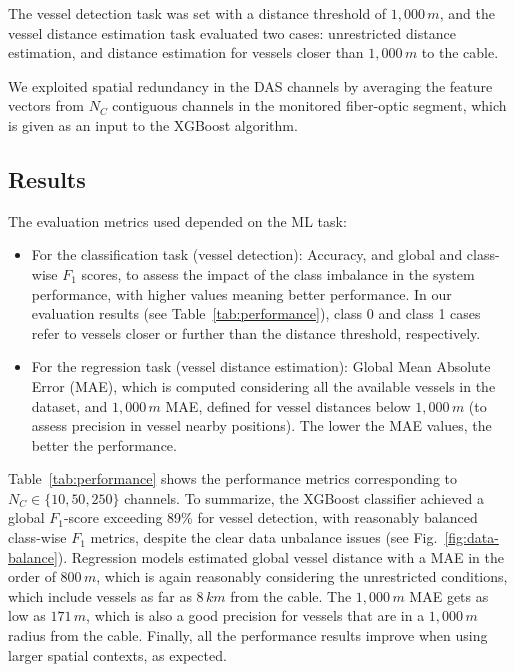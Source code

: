 \documentclass[11pt]{article}
\begin{document}
The vessel detection task was set with a distance threshold of $1{,}000\,m$, and the vessel distance estimation task evaluated two cases: unrestricted distance estimation, and distance estimation for vessels closer than $1{,}000\,m$ to the cable.

We exploited spatial redundancy in the DAS channels by averaging the feature vectors from $N_C$ contiguous channels in the monitored fiber-optic segment, which is given as an input to the XGBoost algorithm.


\subsection{Results}
\label{sec:results}

The evaluation metrics used depended on the ML task:

\begin{itemize}
  \item For the classification task (vessel detection): Accuracy, and global and class-wise $F_1$ scores, to assess the impact of the class imbalance in the system performance, with higher values meaning better performance. In our evaluation results (see Table~\ref{tab:performance}), class 0 and class 1 cases refer to vessels closer or further than the distance threshold, respectively. \item For the regression task (vessel distance estimation): Global Mean Absolute Error (MAE), which is computed considering all the available vessels in the dataset, and $1{,}000\,m$ MAE, defined for vessel distances below $1{,}000\,m$ (to assess precision in vessel nearby positions). The lower the MAE values, the better the performance.
\end{itemize}

Table~\ref{tab:performance} shows the performance metrics corresponding to $N_C \in \lbrace 10, 50, 250 \rbrace$ channels. To summarize, the XGBoost classifier achieved a global $F_1$-score exceeding 89\% for vessel detection, with reasonably balanced class-wise $F_1$ metrics, despite the clear data unbalance issues (see Fig.~\ref{fig:data-balance}). Regression models estimated global vessel distance with a MAE in the order of $800\,m$, which is again reasonably considering the unrestricted conditions, which include vessels as far as $8\,km$ from the cable. The $1{,}000\,m$ MAE gets as low as $171\,m$, which is also a good precision for vessels that are in a $1{,}000\,m$ radius from the cable. Finally, all the performance results improve when using larger spatial contexts, as expected.
\end{document}
